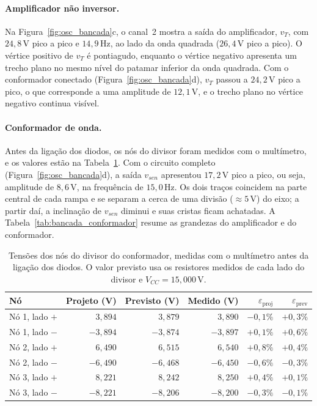 \documentclass[11pt,a4paper]{article}
\begin{document}
\paragraph{Amplificador não inversor.}

Na Figura~\ref{fig:osc_bancada}c, o canal~2 mostra a saída do amplificador, $v_T$, com $24{,}8\,\text{V}$ pico a pico e $14{,}9\,\text{Hz}$, ao lado da onda quadrada ($26{,}4\,\text{V}$ pico a pico). O vértice positivo de $v_T$ é pontiagudo, enquanto o vértice negativo apresenta um trecho plano no mesmo nível do patamar inferior da onda quadrada. Com o conformador conectado (Figura~\ref{fig:osc_bancada}d), $v_T$ passou a $24{,}2\,\text{V}$ pico a pico, o que corresponde a uma amplitude de $12{,}1\,\text{V}$, e o trecho plano no vértice negativo continua visível.

\paragraph{Conformador de onda.}

Antes da ligação dos diodos, os nós do divisor foram medidos com o multímetro, e os valores estão na Tabela~\ref{tab:bancada_divisor}. Com o circuito completo (Figura~\ref{fig:osc_bancada}d), a saída $v_{sen}$ apresentou $17{,}2\,\text{V}$ pico a pico, ou seja, amplitude de $8{,}6\,\text{V}$, na frequência de $15{,}0\,\text{Hz}$. Os dois traços coincidem na parte central de cada rampa e se separam a cerca de uma divisão ($\approx 5\,\text{V}$) do eixo; a partir daí, a inclinação de $v_{sen}$ diminui e suas cristas ficam achatadas. A Tabela~\ref{tab:bancada_conformador} resume as grandezas do amplificador e do conformador.

\begin{table}[H]
\centering
\caption{Tensões dos nós do divisor do conformador, medidas com o multímetro antes da ligação dos diodos. O valor previsto usa os resistores medidos de cada lado do divisor e $V_{CC} = 15{,}000\,\text{V}$.}
\label{tab:bancada_divisor}
\small
\begin{tabular}{@{}lrrrrr@{}}
\toprule
\textbf{Nó} & \textbf{Projeto (V)} & \textbf{Previsto (V)} & \textbf{Medido (V)} & $\varepsilon_{\text{proj}}$ & $\varepsilon_{\text{prev}}$ \\
\midrule
Nó 1, lado $+$ & $3{,}894$ & $3{,}879$ & $3{,}890$ & $-0{,}1\%$ & $+0{,}3\%$ \\
Nó 1, lado $-$ & $-3{,}894$ & $-3{,}874$ & $-3{,}897$ & $+0{,}1\%$ & $+0{,}6\%$ \\
Nó 2, lado $+$ & $6{,}490$ & $6{,}515$ & $6{,}540$ & $+0{,}8\%$ & $+0{,}4\%$ \\
Nó 2, lado $-$ & $-6{,}490$ & $-6{,}468$ & $-6{,}450$ & $-0{,}6\%$ & $-0{,}3\%$ \\
Nó 3, lado $+$ & $8{,}221$ & $8{,}242$ & $8{,}250$ & $+0{,}4\%$ & $+0{,}1\%$ \\
Nó 3, lado $-$ & $-8{,}221$ & $-8{,}206$ & $-8{,}200$ & $-0{,}3\%$ & $-0{,}1\%$ \\
\bottomrule
\end{tabular}
\end{table}
\end{document}
